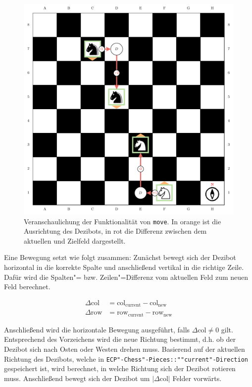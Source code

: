 \begin{figure}[h]
    \includegraphics[width=\textwidth]{../assets/move_function_sketch.drawio.pdf}
    \caption{Veranschaulichung der Funktionalität von \texttt{move}. In orange ist die Ausrichtung des Dezibots, in rot die Differenz zwischen dem aktuellen und Zielfeld dargestellt.}
    \label{fig:move-function-sketch}
\end{figure}


Eine Bewegung setzt wie folgt zusammen: Zunächst bewegt sich der Dezibot horizontal in die korrekte Spalte und anschließend vertikal in die richtige Zeile. Dafür wird die Spalten"= bzw. Zeilen"=Differenz vom aktuellen Feld zum neuen Feld berechnet.

\begin{equation*}
    \begin{aligned}
        \Delta\text{col} &= \text{col}_{\text{current}} - \text{col}_{\text{new}} \\
        \Delta\text{row} &= \text{row}_{\text{current}} - \text{row}_{\text{new}}
    \end{aligned}
\end{equation*}

Anschließend wird die horizontale Bewegung ausgeführt, falls $\Delta\text{col} \ne 0$ gilt. Entsprechend des Vorzeichens wird die neue Richtung bestimmt, d.h. ob der Dezibot sich nach Osten oder Westen drehen muss. Basierend auf der aktuellen Richtung des Dezibots, welche in \texttt{ECP"-Chess"-Pieces::""current"-Direction} gespeichert ist, wird berechnet, in welche Richtung sich der Dezibot rotieren muss. Anschließend bewegt sich der Dezibot um $\vert \Delta\text{col} \vert$ Felder vorwärts.

